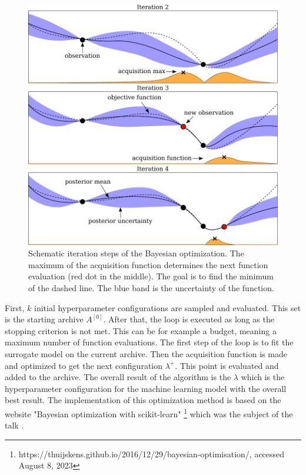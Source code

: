 \begin{figure}[H]
	\centering
	\includegraphics[width=\textwidth]{figures/Fig_2_4_bayesian}
	\caption{ Schematic iteration steps of the Bayesian optimization. The maximum of the acquisition function determines the next function evaluation (red dot in the middle). The goal is to find the minimum of the dashed line. The blue band is the uncertainty of the function. }
	\label{fig:bayesian_optimization}
\end{figure}


First, $ k $ initial hyperparameter configurations are sampled and evaluated. This set is the starting archive $ A^{[0]} $. After that, the loop is executed as long as the stopping criterion is not met. This can be for example a budget, meaning a maximum number of function evaluations. The first step of the loop is to fit the surrogate model on the current archive. Then the acquisition function is made and optimized to get the next configuration $ \lambda^+ $. This point is evaluated and added to the archive. The overall result of the algorithm is the $ \lambda $ which is the hyperparameter configuration for the machine learning model with the overall best result. The implementation of this optimization method is based on the website "Bayesian optimization with scikit-learn" \footnote{https://thuijskens.github.io/2016/12/29/bayesian-optimisation/, accessed August 8, 2023}  which was the subject of the talk \cite{bayesian_optimization_talk}.

